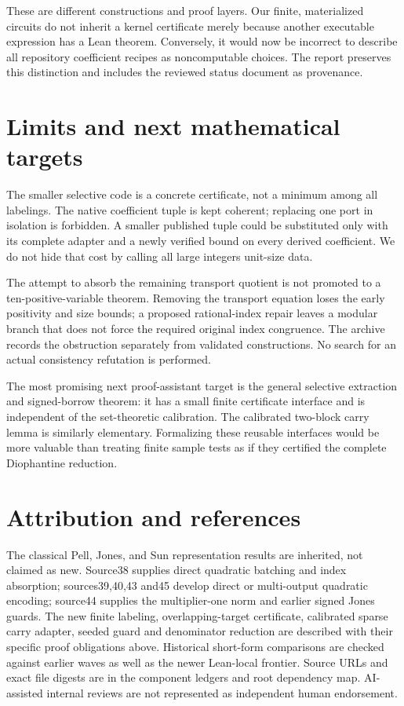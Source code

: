 \documentclass[11pt]{article}
\begin{document}
These are different constructions and proof layers. Our finite,
materialized circuits do not inherit a kernel certificate merely because
another executable expression has a Lean theorem. Conversely, it would
now be incorrect to describe all repository coefficient recipes as
noncomputable choices. The report preserves this distinction and includes
the reviewed status document as provenance.



\section{Limits and next mathematical targets}
The smaller selective code is a concrete certificate, not a minimum
among all labelings. The native coefficient tuple is kept coherent;
replacing one port in isolation is forbidden. A smaller published tuple
could be substituted only with its complete adapter and a newly verified
bound on every derived coefficient. We do not hide that cost by calling
all large integers unit-size data.

The attempt to absorb the remaining transport quotient is not promoted
to a ten-positive-variable theorem. Removing the transport equation
loses the early positivity and size bounds; a proposed rational-index
repair leaves a modular branch that does not force the required original
index congruence. The archive records the obstruction separately from
validated constructions. No search for an actual consistency refutation
is performed.

The most promising next proof-assistant target is the general selective
extraction and signed-borrow theorem: it has a small finite certificate
interface and is independent of the set-theoretic calibration. The
calibrated two-block carry lemma is similarly elementary. Formalizing
these reusable interfaces would be more valuable than treating finite
sample tests as if they certified the complete Diophantine reduction.

\section*{Attribution and references}
The classical Pell, Jones, and Sun representation results are inherited,
not claimed as new. Source38 supplies direct quadratic batching and index
absorption; sources39,40,43 and45 develop direct or multi-output quadratic
encoding; source44 supplies the multiplier-one norm and earlier signed
Jones guards. The new finite labeling, overlapping-target certificate,
calibrated sparse carry adapter, seeded guard and denominator reduction
are described with their specific proof obligations above. Historical
short-form comparisons are checked against earlier waves as well as the
newer Lean-local frontier. Source URLs and exact file digests are in the
component ledgers and root dependency map. AI-assisted internal reviews
are not represented as independent human endorsement.
\end{document}
